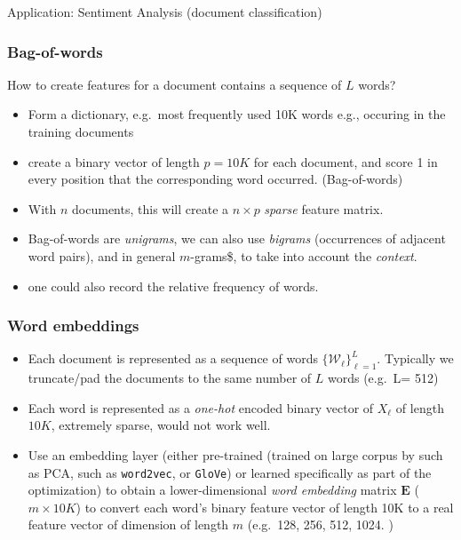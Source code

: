 \documentclass[
  letterpaper,
  DIV=11,
  numbers=noendperiod]{scrreprt}
\providecommand{\tightlist}{%
  \setlength{\itemsep}{0pt}\setlength{\parskip}{0pt}}\usepackage{longtable,booktabs,array}
\begin{document}
Application: Sentiment Analysis (document classification)

\subsubsection{Bag-of-words}\label{bag-of-words}

How to create features for a document contains a sequence of \(L\)
words?

\begin{itemize}
\tightlist
\item
  Form a dictionary, e.g.~most frequently used 10K words e.g., occuring
  in the training documents
\item
  create a binary vector of length \(p=10K\) for each document, and
  score 1 in every position that the corresponding word occurred.
  (Bag-of-words)
\item
  With \(n\) documents, this will create a \(n \times p\) \emph{sparse}
  feature matrix.
\item
  Bag-of-words are \emph{unigrams}, we can also use \emph{bigrams}
  (occurrences of adjacent word pairs), and in general \(m\)-grams\$, to
  take into account the \emph{context}.
\item
  one could also record the relative frequency of words.
\end{itemize}

\subsubsection{Word embeddings}\label{word-embeddings}

\begin{itemize}
\tightlist
\item
  Each document is represented as a sequence of words
  \(\{{\mathcal W}_\ell \}_{\ell=1}^L\). Typically we truncate/pad the
  documents to the same number of \(L\) words (e.g.~L= 512)
\item
  Each word is represented as a \emph{one-hot} encoded binary vector of
  \(X_\ell\) of length \(10K\), extremely sparse, would not work well.
\item
  Use an embedding layer (either pre-trained (trained on large corpus by
  such as PCA, such as \texttt{word2vec}, or \texttt{GloVe}) or learned
  specifically as part of the optimization) to obtain a
  lower-dimensional \emph{word embedding} matrix \({\mathbf E}\)
  (\(m\times 10K\)) to convert each word's binary feature vector of
  length 10K to a real feature vector of dimension of length \(m\)
  (e.g.~128, 256, 512, 1024. )
\end{itemize}
\end{document}
